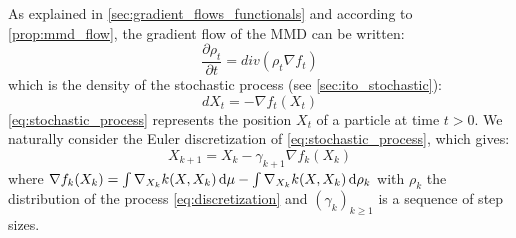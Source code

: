 As explained in \cref{sec:gradient_flows_functionals} and according to \cref{prop:mmd_flow}, the gradient flow of the MMD can be written:
\begin{equation*}
\frac{\partial \rho_t}{\partial t}= div(\rho_t  \nabla f_t)
\end{equation*}
which is the density of the stochastic process (see \cref{sec:ito_stochastic}):
\begin{equation}\label{eq:stochastic_process}
dX_t=-\nabla f_t(X_t) 
\end{equation}
\eqref{eq:stochastic_process} represents the position $X_t$ of a particle at time $t > 0$.
We naturally consider the Euler discretization of \eqref{eq:stochastic_process}, which gives:
\begin{equation}\label{eq:discretization}
X_{k+1}=X_k - \gamma_{k+1} \nabla f_k(X_k)
\end{equation}
where $\nabla f_k(X_k)= \int \nabla_{X_k}k(X,X_k)\mathop{}\!\mathrm{d} \mu - \int \nabla_{X_k}k(X,X_k) \mathop{}\!\mathrm{d} \rho_k$ with $\rho_k$ the distribution of the process \eqref{eq:discretization} and $(\gamma_k)_{k\ge1}$ is a sequence of step sizes.




